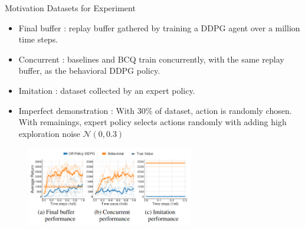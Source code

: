 \documentclass[11pt]{beamer}
\newcommand{\mc}[1]{\mathcal{#1}}
\begin{document}
\begin{frame}{Motivation}
    Datasets for Experiment
    \begin{itemize}
        \item Final buffer : replay buffer gathered by training a DDPG agent over a million time steps.
        \item Concurrent : baselines and BCQ train concurrently, with the same replay buffer, as the behavioral DDPG policy.
        \item Imitation : dataset collected by an expert policy.
        \item Imperfect demonstration : With 30\% of dataset, action is randomly chosen. With remainings, expert policy selects actions randomly with adding high exploration noise $\mc{N}(0, 0.3)$
    \end{itemize}

    \begin{figure}
        \centering
        \includegraphics[width=0.65\textwidth]{Figure1Clipped.png}
    \end{figure}
\end{frame}
\end{document}
